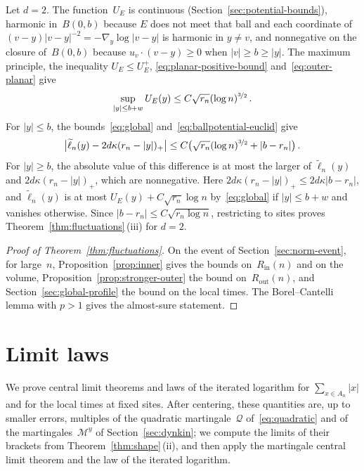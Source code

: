 \documentclass[11pt]{amsart}
\theoremstyle{plain}
\theoremstyle{definition}
\newcommand{\drift}{\kappa}
\newcommand{\nf}{\nicefrac}
\newcommand{\Rin}{R_{\mathrm{in}}}
\newcommand{\Rout}{R_{\mathrm{out}}}
\numberwithin{equation}{section}
\begin{document}
Let $d=2$. The function~$U_E$ is continuous (Section~\ref{sec:potential-bounds}), harmonic in~$B(0,b)$ because $E$ does not meet that ball and each coordinate of $(v-y)|v-y|^{-2}=-\nabla_y\log|v-y|$ is harmonic in $y\neq v$, and nonnegative on the closure of~$B(0,b)$ because $u_v\cdot(v-y)\geq0$ when $|v|\geq b\geq|y|$. The maximum principle, the inequality $U_E\leq U_E^+$, \eqref{eq:planar-positive-bound} and~\eqref{eq:outer-planar} give
\begin{equation*}
\sup_{|y|\leq b+w}U_E(y)\leq C\sqrt{r_n}(\log n)^{\nf32}\, .
\end{equation*}
For $|y|\leq b$, the bounds~\eqref{eq:global} and~\eqref{eq:ballpotential-euclid} give
\begin{equation*}
\bigl|\widetilde\ell_n(y)-2d\drift(r_n-|y|)_+\bigr|\leq C\bigl(\sqrt{r_n}(\log n)^{\nf32}+|b-r_n|\bigr)\, .
\end{equation*}
For $|y|\geq b$, the absolute value of this difference is at most the larger of $\widetilde\ell_n(y)$ and $2d\drift(r_n-|y|)_+$, which are nonnegative. Here $2d\drift(r_n-|y|)_+\leq2d\drift|b-r_n|$, and $\widetilde\ell_n(y)$ is at most $U_E(y)+C\sqrt{r_n}\log n$ by~\eqref{eq:global} if $|y|\leq b+w$ and vanishes otherwise. Since $|b-r_n|\leq C\sqrt{r_n\log n}$, restricting to sites proves Theorem~\ref{thm:fluctuations}\,(iii) for $d=2$.

\begin{proof}[Proof of Theorem~\ref{thm:fluctuations}]
On the event of Section~\ref{sec:norm-event}, for large~$n$, Proposition~\ref{prop:inner} gives the bounds on~$\Rin(n)$ and on the volume, Proposition~\ref{prop:stronger-outer} the bound on~$\Rout(n)$, and Section~\ref{sec:global-profile} the bound on the local times. The Borel--Cantelli lemma with $p>1$ gives the almost-sure statement.
\end{proof}

\section{Limit laws}\label{sec:sharp}

We prove central limit theorems and laws of the iterated logarithm for $\sum_{x\in A_n}|x|$ and for the local times at fixed sites. After centering, these quantities are, up to smaller errors, multiples of the quadratic martingale~$\mathcal Q$ of~\eqref{eq:quadratic} and of the martingales~$\mathcal M^y$ of Section~\ref{sec:dynkin}; we compute the limits of their brackets from Theorem~\ref{thm:shape}\,(ii), and then apply the martingale central limit theorem and the law of the iterated logarithm.
\end{document}
